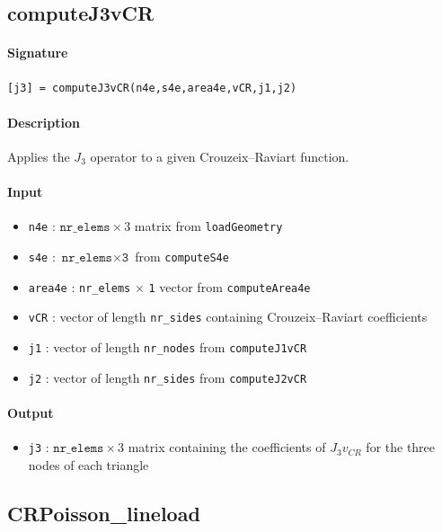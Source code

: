 \documentclass[11pt,a4paper]{article}
\begin{document}
\subsection{computeJ3vCR}

\paragraph{Signature}
\begin{verbatim}
[j3] = computeJ3vCR(n4e,s4e,area4e,vCR,j1,j2)
\end{verbatim}

\paragraph{Description}
Applies the $J_3$ operator to a given Crouzeix--Raviart function.

\paragraph{Input}
\begin{itemize}
    \item \texttt{n4e} : $\texttt{nr\_elems} \times 3$ matrix from \texttt{loadGeometry}
    \item \texttt{s4e} : \(\texttt{nr\_elems} \times \texttt{3}\) from \texttt{computeS4e}
    \item \texttt{area4e} : \texttt{nr\_elems} \(\times\) \texttt{1} vector from \texttt{computeArea4e}
    \item \texttt{vCR} : vector of length \texttt{nr\_sides} containing Crouzeix--Raviart coefficients
    \item \texttt{j1} : vector of length \texttt{nr\_nodes} from \texttt{computeJ1vCR}
    \item \texttt{j2} : vector of length \texttt{nr\_sides} from \texttt{computeJ2vCR}
\end{itemize}

\paragraph{Output}
\begin{itemize}
    \item \texttt{j3} : $\texttt{nr\_elems} \times 3$ matrix containing the 
          coefficients of $J_3 v_{CR}$ for the three nodes of each triangle
\end{itemize}


\subsection{CRPoisson\_lineload}
\end{document}
